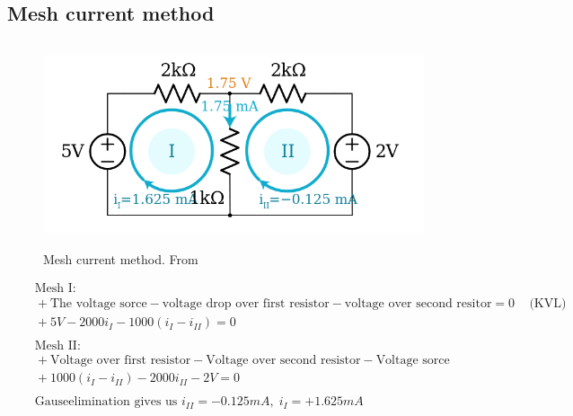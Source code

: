 \newpage
\subsection{Mesh current method}

\begin{figure}[h]
    \vspace{10mm}
    \centering
    \includegraphics[width=12cm, height=6cm]{image/mesh_current_method.png}
    \caption{Mesh current method. From \cite{}}
\end{figure}

\begin{align*}
  &\quad  \text{Mesh I: } \\
  &\quad  +\text{The voltage sorce} -\text{voltage drop over first resistor} 
  -\text{voltage over second resitor} = 0 \;\;\; \text{ (KVL)} \\
  &\quad  +5V -2000i_I -1000(i_I-i_{II}) = 0 \\
  &\quad  \\
  &\quad  \text{Mesh II: } \\
  &\quad  +\text{Voltage over first resistor} -\text{Voltage over second resistor} 
  -\text{Voltage sorce} \\
  &\quad  +1000(i_I-i_{II}) -2000i_{II} -2V = 0 \\
  &\quad  \\
  &\quad  \text{Gauseelimination gives us } i_{II} = -0.125mA, \; i_I = +1.625mA \\
\end{align*}


